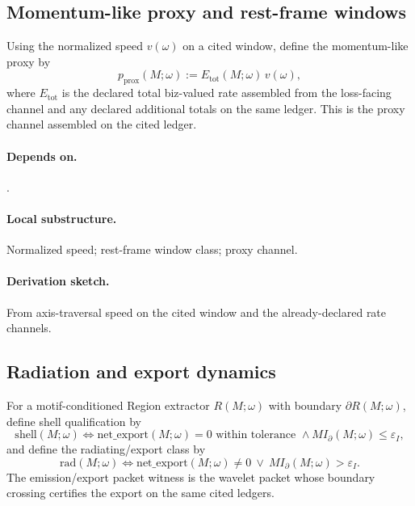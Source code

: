 \subsection{Momentum-like proxy and rest-frame windows}\label{subsec:momentum-proxy}
\begin{definition}
\label{def:momentum-proxy-operator}
Using the normalized speed $v(\omega)$ on a cited window, define the momentum-like proxy by
\[
p_{\mathrm{prox}}(M;\omega):=E_{\mathrm{tot}}(M;\omega)\,v(\omega),
\]
where $E_{\mathrm{tot}}$ is the declared total biz-valued rate assembled from the loss-facing channel and any declared additional totals on the same ledger. This is the proxy channel assembled on the cited ledger.
\end{definition}

\paragraph{Depends on.} .
\paragraph{Local substructure.} Normalized speed; rest-frame window class; proxy channel.
\paragraph{Derivation sketch.} From axis-traversal speed on the cited window and the already-declared rate channels.

\subsection{Radiation and export dynamics}\label{subsec:radiation-export-dynamics}
\begin{definition}
\label{def:radiation-dynamics-operator}
For a motif-conditioned Region extractor $R(M;\omega)$ with boundary $\partial R(M;\omega)$, define shell qualification by
\[
\mathrm{shell}(M;\omega)\iff \mathrm{net\_export}(M;\omega)=0\text{ within tolerance }\wedge MI_{\partial}(M;\omega)\le \varepsilon_I,
\]
and define the radiating/export class by
\[
\mathrm{rad}(M;\omega)\iff \mathrm{net\_export}(M;\omega)\neq 0\ \vee\ MI_{\partial}(M;\omega)>\varepsilon_I.
\]
The emission/export packet witness is the wavelet packet whose boundary crossing certifies the export on the same cited ledgers.
\end{definition}


